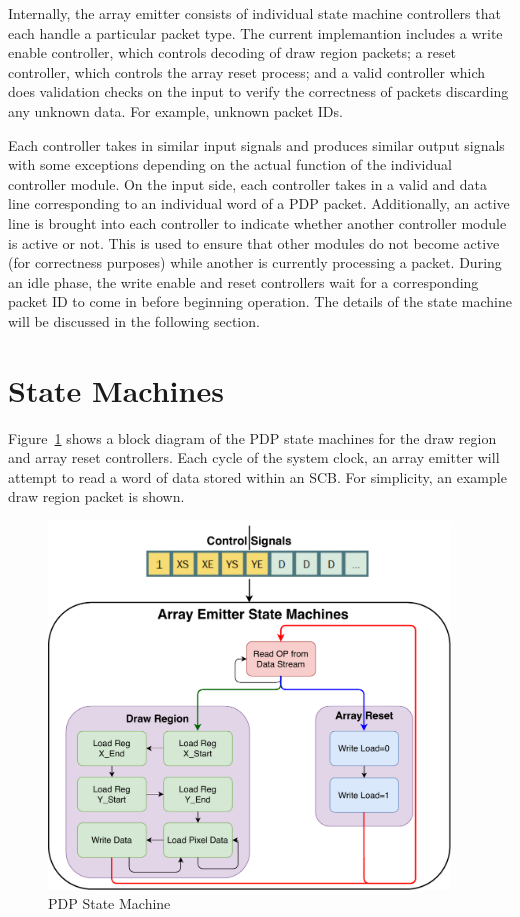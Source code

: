     Internally, the array emitter consists of individual state machine controllers that each handle a particular packet type. The current implemantion includes a write enable controller, which controls decoding of draw region packets; a reset controller, which controls the array reset process; and a valid controller which does validation checks on the input to verify the correctness of packets discarding any unknown data. For example, unknown packet IDs.

    Each controller takes in similar input signals and produces similar output signals with some exceptions depending on the actual function of the individual controller module. On the input side, each controller takes in a valid and data line corresponding to an individual word of a PDP packet. Additionally, an active line is brought into each controller to indicate whether another controller module is active or not. This is used to ensure that other modules do not become active (for correctness purposes) while another is currently processing a packet. During an idle phase, the write enable and reset controllers wait for a corresponding packet ID to come in before beginning operation. The details of the state machine will be discussed in the following section.

\section{State Machines}
    \label{sec:state_machines}
    Figure~\ref{fig:state_machine} shows a block diagram of the PDP state machines for the draw region and array reset controllers. Each cycle of the system clock, an array emitter will attempt to read a word of data stored within an SCB. For simplicity, an example draw region packet is shown.

    \begin{figure}[t]
        \centering
        \includegraphics[width=0.95\textwidth]{fig/pdp_state_machine.pdf}
        \caption{PDP State Machine}
        \label{fig:state_machine}
    \end{figure}


